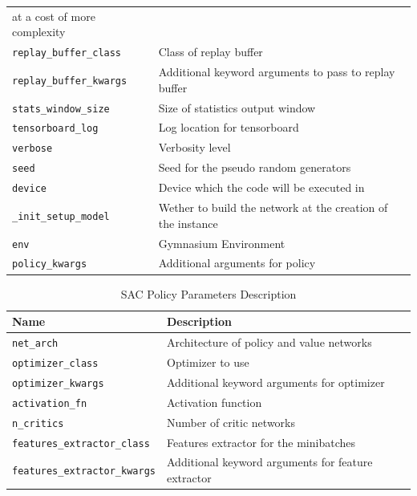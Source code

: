 \begin{table}[ht!]
\begin{tabular}{lp{8cm}}
		at a cost of more complexity \\
		\texttt{replay\_buffer\_class} & Class of replay buffer \\
		\texttt{replay\_buffer\_kwargs} & Additional keyword arguments to pass to replay buffer \\
		\texttt{stats\_window\_size} & Size of statistics output window \\
		\texttt{tensorboard\_log} & Log location for tensorboard \\
		\texttt{verbose} & Verbosity level \\
		\texttt{seed} & Seed for the pseudo random generators \\
		\texttt{device} & Device which the code will be executed in \\
		\texttt{\_init\_setup\_model} & Wether to build the network at the creation of the instance \\
		\texttt{env} & Gymnasium Environment \\
		\texttt{policy\_kwargs} & Additional arguments for policy \\
		
		\bottomrule
	\end{tabular}
	\label{tab:sac-params}
\end{table}

\begin{table}[ht!]
	\centering
	\caption{\ac{SAC} Policy Parameters Description}
	\begin{tabular}{lp{8cm}}
		\toprule
		\textbf{Name} & \textbf{Description} \\
		\midrule
		\texttt{net\_arch} & Architecture of policy and value networks \\
		\texttt{optimizer\_class} & Optimizer to use \\
		\texttt{optimizer\_kwargs} & Additional keyword arguments for optimizer \\
		\texttt{activation\_fn} & Activation function \\
		\texttt{n\_critics} & Number of critic networks \\
		\texttt{features\_extractor\_class} & Features extractor for the minibatches  \\
		\texttt{features\_extractor\_kwargs} & Additional keyword arguments for feature extractor \\
		\bottomrule
	\end{tabular}
	\label{tab:sac-pol-params}
\end{table}

